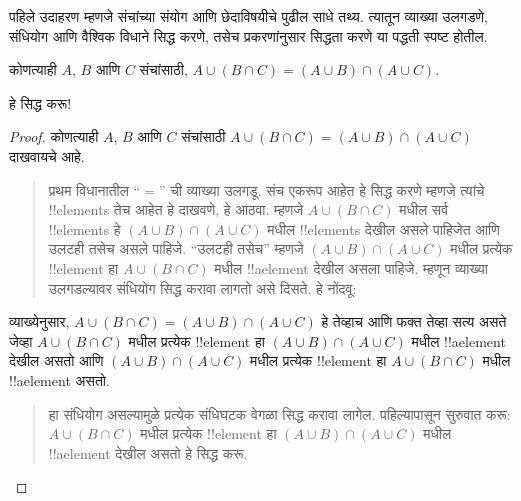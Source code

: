 \documentclass[../../../include/open-logic-section]{subfiles}
\begin{document}


पहिले उदाहरण म्हणजे संचांच्या संयोग आणि छेदाविषयीचे पुढील साधे तथ्य. त्यातून व्याख्या उलगडणे, संधियोग आणि वैश्विक विधाने सिद्ध करणे, तसेच प्रकरणांनुसार सिद्धता करणे या पद्धती स्पष्ट होतील.

\begin{prop}
कोणत्याही $A$, $B$ आणि $C$ संचांसाठी, $A \cup (B \cap C) = (A \cup B) \cap (A \cup C)$.
\end{prop}

हे सिद्ध करू!{}

\begin{proof}
कोणत्याही $A$, $B$ आणि $C$ संचांसाठी $A \cup (B \cap C) = (A \cup B) \cap (A \cup C)$ दाखवायचे आहे.
\begin{quote}
प्रथम विधानातील “$=$” ची व्याख्या उलगडू. संच एकरूप आहेत हे सिद्ध करणे म्हणजे त्यांचे !!{element}s तेच आहेत हे दाखवणे, हे आठवा. म्हणजे $A \cup (B \cap C)$ मधील सर्व !!{element}s हे $(A \cup B) \cap (A \cup C)$ मधील !!{element}s देखील असले पाहिजेत आणि उलटही तसेच असले पाहिजे. “उलटही तसेच” म्हणजे $(A \cup B) \cap (A \cup C)$ मधील प्रत्येक !!{element} हा $A \cup (B \cap C)$ मधील !!a{element} देखील असला पाहिजे. म्हणून व्याख्या उलगडल्यावर संधियोग सिद्ध करावा लागतो असे दिसते. हे नोंदवू:
\end{quote}
व्याख्येनुसार, $A \cup (B \cap C) = (A \cup B) \cap (A \cup C)$ हे तेव्हाच आणि फक्त तेव्हा सत्य असते जेव्हा $A \cup (B \cap C)$ मधील प्रत्येक !!{element} हा $(A \cup B) \cap (A \cup C)$ मधील !!a{element} देखील असतो आणि $(A \cup B) \cap (A \cup C)$ मधील प्रत्येक !!{element} हा $A \cup (B \cap C)$ मधील !!a{element} असतो.
\begin{quote}
हा संधियोग असल्यामुळे प्रत्येक संधिघटक वेगळा सिद्ध करावा लागेल. पहिल्यापासून सुरुवात करू: $A \cup (B \cap C)$ मधील प्रत्येक !!{element} हा $(A \cup B) \cap (A \cup C)$ मधील !!a{element} देखील असतो हे सिद्ध करू.


\end{quote}
\end{proof}
\end{document}
